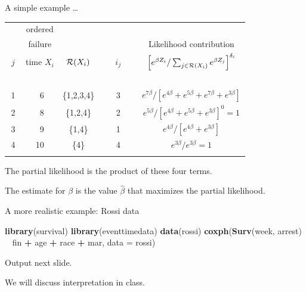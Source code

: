 \documentclass[ignorenonframetext,]{beamer}
\newenvironment{Shaded}{\begin{snugshade}}{\end{snugshade}}
\newcommand{\DataTypeTok}[1]{\textcolor[rgb]{0.13,0.29,0.53}{#1}}
\newcommand{\KeywordTok}[1]{\textcolor[rgb]{0.13,0.29,0.53}{\textbf{#1}}}
\newcommand{\NormalTok}[1]{#1}
\newcommand{\OperatorTok}[1]{\textcolor[rgb]{0.81,0.36,0.00}{\textbf{#1}}}
\newcommand{\StringTok}[1]{\textcolor[rgb]{0.31,0.60,0.02}{#1}}
\begin{document}
\begin{frame}{%
\protect\hypertarget{a-simple-example-1}{%
A simple example \ldots}}

\footnotesize
\begin{center}
\begin{tabular}{ccccc}
    & ordered & \\
    & failure & & & Likelihood contribution\\
$j$ & time $X_i$ &  ${\cal R}(X_i)$  & ~~~$i_j$~~~ & 
$\left[e^{\beta Z_i}/
\sum_{j\in {\cal R}(X_i)} e^{\beta Z_j}\right]^{\delta_i}$ \\ \hline 
~~\\
1 & ~6 & \{1,2,3,4\} & 3 & 
$e^{7\beta}/[e^{4\beta} + e^{5\beta} + e^{7\beta} + e^{3\beta}]$\\[3ex]
2 & ~8 & \{1,2,4\} & 2 & $e^{5\beta}/[e^{4\beta} + e^{5\beta} + e^{3\beta}]^0 = 1$ \\[3ex]
3 & ~9 & \{1,4\} & 1 & 
$e^{4\beta}/[e^{4\beta} + e^{3\beta}]$\\[3ex]
4 & 10 & \{4\} & 4 & 
$e^{3\beta}/e^{3\beta}=1$ \\ \\ \hline 
\end{tabular}
\end{center}

The partial likelihood is the product of these four terms.

The estimate for \(\beta\) is the value \(\widehat{\beta}\) that
maximizes the partial likelihood.

\end{frame}

\begin{frame}[fragile]{%
\protect\hypertarget{a-more-realistic-example-rossi-data}{%
A more realistic example: Rossi data}}

\small

\begin{Shaded}
\begin{Highlighting}[]
\KeywordTok{library}\NormalTok{(survival)}
\KeywordTok{library}\NormalTok{(eventtimedata)}
\KeywordTok{data}\NormalTok{(rossi)}
\KeywordTok{coxph}\NormalTok{(}\KeywordTok{Surv}\NormalTok{(week, arrest) }\OperatorTok{~}\StringTok{ }\NormalTok{fin }\OperatorTok{+}\StringTok{ }\NormalTok{age }\OperatorTok{+}\StringTok{ }\NormalTok{race }\OperatorTok{+}\StringTok{ }\NormalTok{mar, }
      \DataTypeTok{data =}\NormalTok{ rossi)}
\end{Highlighting}
\end{Shaded}

Output next slide.

We will discuss interpretation in class.

\end{frame}
\end{document}
